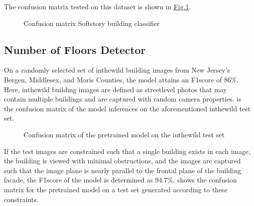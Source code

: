 \documentclass[letterpaper,10pt,english]{sphinxmanual}
\begin{document}
\sphinxAtStartPar
The confusion matrix tested on this dataset is shown in \hyperref[\detokenize{common/technical_manual/softstory:fig-confusion-softstory}]{Fig.\@ \ref{\detokenize{common/technical_manual/softstory:fig-confusion-softstory}}}.

\begin{figure}[htbp]
\centering
\capstart

\noindent{}
\caption{Confusion matrix \sphinxhyphen{} Soft\sphinxhyphen{}story building classifier}\label{\detokenize{common/technical_manual/softstory:id1}}\label{\detokenize{common/technical_manual/softstory:fig-confusion-softstory}}\end{figure}


\subsection{Number of Floors Detector}
\label{\detokenize{common/technical_manual/nfloor:number-of-floors-detector}}\label{\detokenize{common/technical_manual/nfloor:lbl-nfloordetector-vnv}}\label{\detokenize{common/technical_manual/nfloor::doc}}
\sphinxAtStartPar
On a randomly selected set of in\sphinxhyphen{}the\sphinxhyphen{}wild building images from New Jersey’s Bergen, Middlesex, and Moris Counties, the model attains an F1\sphinxhyphen{}score of 86\%. Here, in\sphinxhyphen{}the\sphinxhyphen{}wild building images are defined as street\sphinxhyphen{}level photos that may contain multiple buildings and are captured with random camera properties.  is the confusion matrix of the model inferences on the aforementioned in\sphinxhyphen{}the\sphinxhyphen{}wild test set.

\begin{figure}[htbp]
\centering
\capstart

\noindent{}
\caption{Confusion matrix of the pretrained model on the in\sphinxhyphen{}the\sphinxhyphen{}wild test set}\label{\detokenize{common/technical_manual/nfloor:id1}}\label{\detokenize{common/technical_manual/nfloor:confusion-nfloorwild}}\end{figure}

\sphinxAtStartPar
If the test images are constrained such that a single building exists in each image, the building is viewed with minimal obstructions, and the images are captured such that the image plane is nearly parallel to the frontal plane of the building facade, the F1\sphinxhyphen{}score of the model is determined as 94.7\%.  shows the confusion matrix for the pretrained model on a test set generated according to these constraints.
\end{document}
